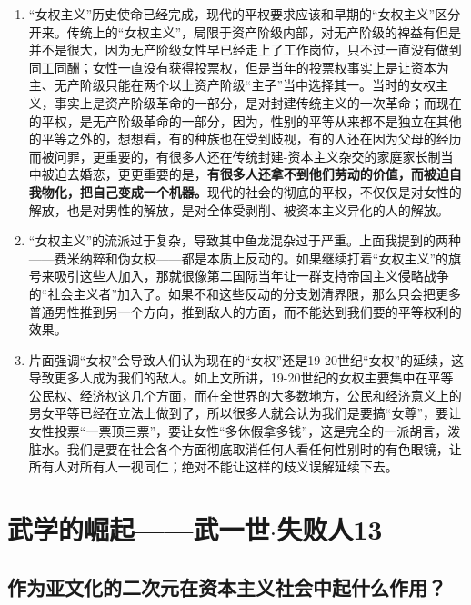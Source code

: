 \documentclass{ctexart}
\begin{document}
	\begin{enumerate}
		
		\item “女权主义”历史使命已经完成，现代的平权要求应该和早期的“女权主义”区分开来。传统上的“女权主义”，局限于资产阶级内部，对无产阶级的裨益有但是并不是很大，因为无产阶级女性早已经走上了工作岗位，只不过一直没有做到同工同酬；女性一直没有获得投票权，但是当年的投票权事实上是让资本为主、无产阶级只能在两个以上资产阶级“主子”当中选择其一。当时的女权主义，事实上是资产阶级革命的一部分，是对封建传统主义的一次革命；而现在的平权，是无产阶级革命的一部分，因为，性别的平等从来都不是独立在其他的平等之外的，想想看，有的种族也在受到歧视，有的人还在因为父母的经历而被问罪，更重要的，有很多人还在传统封建-资本主义杂交的家庭家长制当中被迫去婚恋，更更重要的是，{\bf 有很多人还拿不到他们劳动的价值，而被迫自我物化，把自己变成一个机器。}现代的社会的彻底的平权，不仅仅是对女性的解放，也是对男性的解放，是对全体受剥削、被资本主义异化的人的解放。
		
		\item “女权主义”的流派过于复杂，导致其中鱼龙混杂过于严重。上面我提到的两种——费米纳粹和伪女权——都是本质上反动的。如果继续打着“女权主义”的旗号来吸引这些人加入，那就很像第二国际当年让一群支持帝国主义侵略战争的“社会主义者”加入了。如果不和这些反动的分支划清界限，那么只会把更多普通男性推到另一个方向，推到敌人的方面，而不能达到我们要的平等权利的效果。
		
		\item 片面强调“女权”会导致人们认为现在的“女权”还是19-20世纪“女权”的延续，这导致更多人成为我们的敌人。如上文所讲，19-20世纪的女权主要集中在平等公民权、经济权这几个方面，而在全世界的大多数地方，公民和经济意义上的男女平等已经在立法上做到了，所以很多人就会认为我们是要搞“女尊”，要让女性投票“一票顶三票”，要让女性“多休假拿多钱”，这是完全的一派胡言，泼脏水。我们是要在社会各个方面彻底取消任何人看任何性别时的有色眼镜，让所有人对所有人一视同仁；绝对不能让这样的歧义误解延续下去。
		
	\end{enumerate}
	
	\section{武学的崛起——武一世$\cdot$失败人13}
	
	\subsection{作为亚文化的二次元在资本主义社会中起什么作用？}
	
\end{document}
